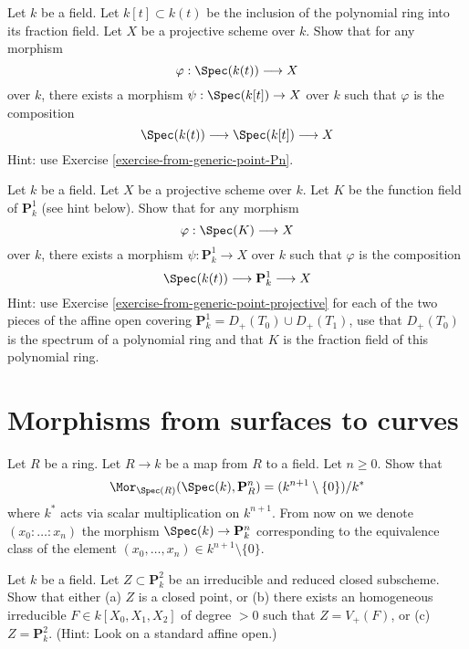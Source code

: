 \begin{exercise}
\label{exercise-from-generic-point-projective}
Let $k$ be a field. Let $k[t] \subset k(t)$ be the
inclusion of the polynomial ring into its fraction field.
Let $X$ be a projective scheme over $k$.
Show that for any morphism
$$
\varphi : \Spec(k(t)) \longrightarrow X
$$
over $k$, there exists a morphism $\psi : \Spec(k[t]) \to X$
over $k$ such that $\varphi$ is the composition
$$
\Spec(k(t)) \longrightarrow \Spec(k[t]) \longrightarrow X
$$
Hint: use Exercise \ref{exercise-from-generic-point-Pn}.
\end{exercise}

\begin{exercise}
\label{exercise-from-generic-point-P1-to-projective}
Let $k$ be a field. Let $X$ be a projective scheme over $k$.
Let $K$ be the function field of $\mathbf{P}^1_k$ (see hint below).
Show that for any morphism
$$
\varphi : \Spec(K) \longrightarrow X
$$
over $k$, there exists a morphism $\psi : \mathbf{P}^1_k \to X$
over $k$ such that $\varphi$ is the composition
$$
\Spec(k(t)) \longrightarrow \mathbf{P}^1_k \longrightarrow X
$$
Hint: use Exercise \ref{exercise-from-generic-point-projective}
for each of the two pieces of the affine open covering
$\mathbf{P}^1_k = D_+(T_0) \cup D_+(T_1)$, use that
$D_+(T_0)$ is the spectrum of a polynomial ring and that
$K$ is the fraction field of this polynomial ring.
\end{exercise}







\section{Morphisms from surfaces to curves}
\label{section-from-surfaces-to-curves}

\begin{exercise}
\label{exercise-points-projective-space}
Let $R$ be a ring.
Let $R \to k$ be a map from $R$ to a field.
Let $n \geq 0$.
Show that
$$
\Mor_{\Spec(R)}(\Spec(k), \mathbf{P}^n_R)
=
(k^{n + 1} \setminus \{0\})/k^*
$$
where $k^*$ acts via scalar multiplication on $k^{n + 1}$.
From now on we denote $(x_0 : \ldots : x_n)$ the
morphism $\Spec(k) \to \mathbf{P}^n_k$ corresponding
to the equivalence class of the element
$(x_0, \ldots, x_n) \in k^{n + 1} \setminus \{0\}$.
\end{exercise}

\begin{exercise}
\label{exercise-curve-projective-plane}
Let $k$ be a field. Let $Z \subset \mathbf{P}^2_k$ be an
irreducible and reduced closed subscheme.
Show that either (a) $Z$ is a closed point, or (b) there exists
an homogeneous irreducible $F \in k[X_0, X_1, X_2]$ of degree $> 0$
such that $Z = V_{+}(F)$, or (c) $Z = \mathbf{P}^2_k$.
(Hint: Look on a standard affine open.)
\end{exercise}

